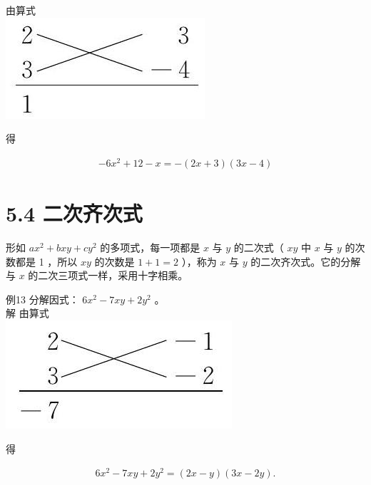\documentclass[10pt]{article}
\begin{document}
由算式\\
\includegraphics[max width=\textwidth, center]{2024_10_30_bd799899fef40368a068g-038(3)}

得

\begin{align*}
-6 x^{2}+12-x=-(2 x+3)(3 x-4)
\end{align*}

\section*{5.4 二次齐次式}
形如 $a x^{2}+b x y+c y^{2}$ 的多项式，每一项都是 $x$ 与 $y$ 的二次式（ $x y$ 中 $x$ 与 $y$ 的次数都是 1 ，所以 $x y$ 的次数是 $1+1=2$ ），称为 $x$ 与 $y$ 的二次齐次式。它的分解与 $x$ 的二次三项式一样，采用十字相乘。

例13 分解因式： $6 x^{2}-7 x y+2 y^{2}$ 。\\
解 由算式\\
\includegraphics[max width=\textwidth, center]{2024_10_30_bd799899fef40368a068g-038(1)}

得

\begin{align*}
6 x^{2}-7 x y+2 y^{2}=(2 x-y)(3 x-2 y) .
\end{align*}
\end{document}
